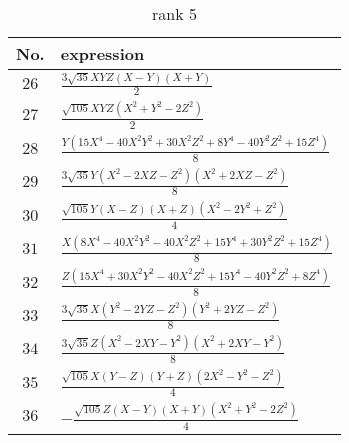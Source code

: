 \documentclass[fleqn,8pt,landscape]{jsarticle}
\begin{document}
\begin{table}[ht!]
\begin{center}
\caption{rank 5}
\renewcommand{\arraystretch}{1.3}
\begin{tabular}{cl} \hline \hline
No. & expression \\ \hline
$ 26 $ & $ \frac{3 \sqrt{35} X Y Z \left(X - Y\right) \left(X + Y\right)}{2} $ \\
$ 27 $ & $ \frac{\sqrt{105} X Y Z \left(X^{2} + Y^{2} - 2 Z^{2}\right)}{2} $ \\
$ 28 $ & $ \frac{Y \left(15 X^{4} - 40 X^{2} Y^{2} + 30 X^{2} Z^{2} + 8 Y^{4} - 40 Y^{2} Z^{2} + 15 Z^{4}\right)}{8} $ \\
$ 29 $ & $ \frac{3 \sqrt{35} Y \left(X^{2} - 2 X Z - Z^{2}\right) \left(X^{2} + 2 X Z - Z^{2}\right)}{8} $ \\
$ 30 $ & $ \frac{\sqrt{105} Y \left(X - Z\right) \left(X + Z\right) \left(X^{2} - 2 Y^{2} + Z^{2}\right)}{4} $ \\
$ 31 $ & $ \frac{X \left(8 X^{4} - 40 X^{2} Y^{2} - 40 X^{2} Z^{2} + 15 Y^{4} + 30 Y^{2} Z^{2} + 15 Z^{4}\right)}{8} $ \\
$ 32 $ & $ \frac{Z \left(15 X^{4} + 30 X^{2} Y^{2} - 40 X^{2} Z^{2} + 15 Y^{4} - 40 Y^{2} Z^{2} + 8 Z^{4}\right)}{8} $ \\
$ 33 $ & $ \frac{3 \sqrt{35} X \left(Y^{2} - 2 Y Z - Z^{2}\right) \left(Y^{2} + 2 Y Z - Z^{2}\right)}{8} $ \\
$ 34 $ & $ \frac{3 \sqrt{35} Z \left(X^{2} - 2 X Y - Y^{2}\right) \left(X^{2} + 2 X Y - Y^{2}\right)}{8} $ \\
$ 35 $ & $ \frac{\sqrt{105} X \left(Y - Z\right) \left(Y + Z\right) \left(2 X^{2} - Y^{2} - Z^{2}\right)}{4} $ \\
$ 36 $ & $ - \frac{\sqrt{105} Z \left(X - Y\right) \left(X + Y\right) \left(X^{2} + Y^{2} - 2 Z^{2}\right)}{4} $ \\
 \hline \hline
\end{tabular}
\end{center}
\end{table}
\end{document}
